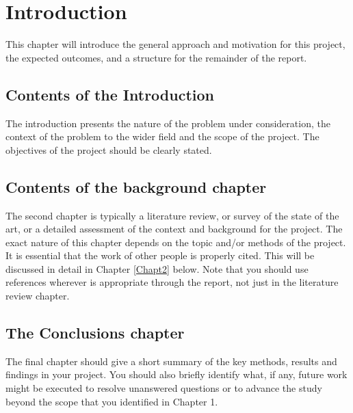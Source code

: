 \chapter{Introduction}
This chapter will introduce the general approach and motivation for this project, the expected outcomes, and a structure for the remainder of the report.

\section{Contents of the Introduction} 
The introduction presents the nature of the problem under consideration, the context of the problem to the wider field and the scope of the project. The objectives of the project should be clearly stated.
\section{Contents of the background chapter}	
The second chapter is typically a literature review, or survey of the state of the art, or a detailed assessment of the context and background for the project. The exact nature of this chapter depends on the topic and/or methods of the project. It is essential that the work of other people is properly cited. This will be discussed in detail in Chapter \ref{Chapt2} below. Note that you should use references wherever is appropriate through the report, not just in the literature review chapter.
\section{The Conclusions chapter} 
The final chapter should give a short summary of the key methods, results and findings in your project. You should also briefly identify what, if any, future work might be executed to resolve unanswered questions or to advance the study beyond the scope that you identified in Chapter 1. 
